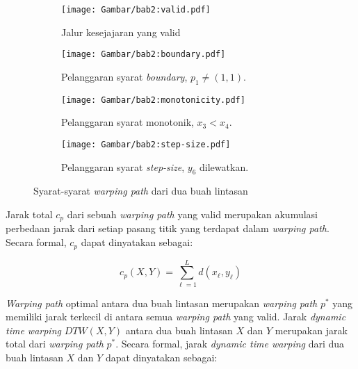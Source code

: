 \begin{figure}[t]
    \centering
    \begin{subfigure}[h]{0.225\textwidth}
        \centering
        \texttt{[image: Gambar/bab2:valid.pdf]}
        \caption{Jalur kesejajaran yang valid}
        \label{bab2:valid}
    \end{subfigure}
    \begin{subfigure}[h]{0.225\textwidth}
        \centering
        \texttt{[image: Gambar/bab2:boundary.pdf]}
        \caption{Pelanggaran syarat \textit{boundary}, $p_1 \neq (1, 1)$.}
        \label{bab2:boundary}
    \end{subfigure}
    \begin{subfigure}[h]{0.225\textwidth}
        \centering
        \texttt{[image: Gambar/bab2:monotonicity.pdf]}
        \caption{Pelanggaran syarat monotonik, $x_3 < x_4$.}
        \label{bab2:monotonicity}
    \end{subfigure}
    \begin{subfigure}[h]{0.225\textwidth}
        \centering
        \texttt{[image: Gambar/bab2:step-size.pdf]}
        \caption{Pelanggaran syarat \textit{step-size}, $y_6$ dilewatkan.}
        \label{bab2:step-size}
    \end{subfigure}
    \caption[Syarat-syarat \textit{warping path}]{Syarat-syarat \textit{warping path} dari dua buah lintasan}
    \label{bab2:dtw-requirements}
\end{figure}

Jarak total $c_p$ dari sebuah \textit{warping path} yang valid merupakan akumulasi perbedaan jarak dari setiap pasang titik yang terdapat dalam \textit{warping path}. Secara formal, $c_p$ dapat dinyatakan sebagai:

\begin{equation}
    c_p(X, Y) = \sum_{\ell = 1}^{L} d(x_\ell, y_\ell)
    \label{bab2:warping-path-length}
\end{equation}

\newpage

\textit{Warping path} optimal antara dua buah lintasan merupakan \textit{warping path} $p^*$ yang memiliki jarak terkecil di antara semua \textit{warping path} yang valid. Jarak \textit{dynamic time warping} $DTW(X, Y)$ antara dua buah lintasan $X$ dan $Y$ merupakan jarak total dari \textit{warping path} $p^*$. Secara formal, jarak \textit{dynamic time warping} dari dua buah lintasan $X$ dan $Y$ dapat dinyatakan sebagai:

